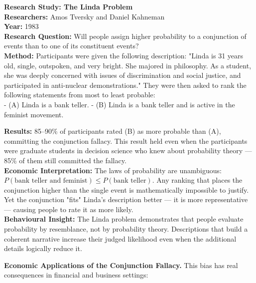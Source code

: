 \documentclass[12pt, letterpaper]{article}
\begin{document}
\begin{researchbox}
\textbf{Research Study: The Linda Problem}\\[4pt]

\textbf{Researchers:} Amos Tversky and Daniel Kahneman\\[4pt]
\textbf{Year:} 1983\\[4pt]
\textbf{Research Question:} Will people assign higher probability to a conjunction of events than to one of its constituent events?\\[4pt]
\textbf{Method:} Participants were given the following description: "Linda is 31 years old, single, outspoken, and very bright. She majored in philosophy. As a student, she was deeply concerned with issues of discrimination and social justice, and participated in anti-nuclear demonstrations." They were then asked to rank the following statements from most to least probable:\\[4pt]
- (A) Linda is a bank teller.
- (B) Linda is a bank teller and is active in the feminist movement.

\textbf{Results:} 85--90\% of participants rated (B) as more probable than (A), committing the conjunction fallacy. This result held even when the participants were graduate students in decision science who knew about probability theory --- 85\% of them still committed the fallacy.\\[4pt]
\textbf{Economic Interpretation:} The laws of probability are unambiguous: $P(\text{bank teller and feminist}) \leq P(\text{bank teller})$. Any ranking that places the conjunction higher than the single event is mathematically impossible to justify. Yet the conjunction "fits" Linda's description better --- it is more representative --- causing people to rate it as more likely.\\[4pt]
\textbf{Behavioural Insight:} The Linda problem demonstrates that people evaluate probability by resemblance, not by probability theory. Descriptions that build a coherent narrative increase their judged likelihood even when the additional details logically reduce it.\\[4pt]
\end{researchbox}

\textbf{Economic Applications of the Conjunction Fallacy.} This bias has real consequences in financial and business settings:
\end{document}
